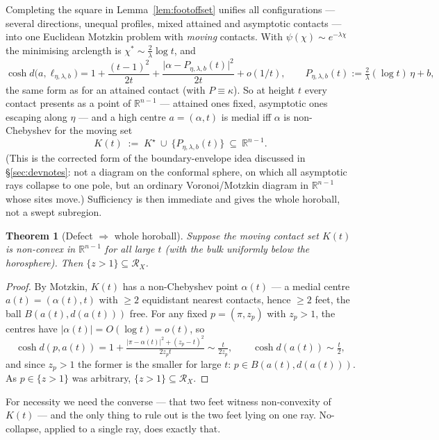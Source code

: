 \documentclass[11pt]{article}
\newtheorem{theorem}{Theorem}[section]
\theoremstyle{remark}
\newcommand{\R}{\mathbb{R}}
\newcommand{\X}{X}
\newcommand{\Rx}{\mathcal{R}_{\X}}
\newcommand{\B}{B}
\begin{document}
Completing the square in
Lemma~\ref{lem:footoffset} unifies all configurations --- several
directions, unequal profiles, mixed attained and asymptotic contacts ---
into one Euclidean Motzkin problem with \emph{moving} contacts. With
$\psi(\chi)\sim e^{-\lambda\chi}$ the minimising arclength is
$\chi^{\ast}\sim\frac{2}{\lambda}\log t$, and
\[
\cosh d\bigl(a,\ell_{\eta,\lambda,b}\bigr)
=1+\frac{(t-1)^{2}}{2t}+\frac{\bigl\lvert\alpha-P_{\eta,\lambda,b}(t)
\bigr\rvert^{2}}{2t}+o(1/t),\qquad
P_{\eta,\lambda,b}(t):=\tfrac{2}{\lambda}(\log t)\,\eta+b ,
\]
the same form as for an attained contact (with $P\equiv\kappa$). So at
height $t$ every contact presents as a point of $\R^{n-1}$ --- attained
ones fixed, asymptotic ones escaping along $\eta$ --- and a high centre
$a=(\alpha,t)$ is medial iff $\alpha$ is non-Chebyshev for the moving set
\[
K(t)\;:=\;K^{\star}\ \cup\ \bigl\{P_{\eta,\lambda,b}(t)\bigr\}
\ \subseteq\ \R^{n-1}.
\]
(This is the corrected form of the boundary-envelope idea discussed in
\S\ref{sec:devnotes}: not a diagram on the conformal sphere, on which all
asymptotic rays collapse to one pole, but an ordinary Voronoi/Motzkin
diagram in $\R^{n-1}$ whose sites move.) Sufficiency is then immediate
and gives the whole horoball, not a swept subregion.

\begin{theorem}[Defect $\Rightarrow$ whole horoball]\label{thm:movingsuff}
Suppose the moving contact set $K(t)$ is non-convex in $\R^{n-1}$ for
all large $t$ (with the bulk uniformly below the horosphere). Then
$\{z>1\}\subseteq\Rx$.
\end{theorem}

\begin{proof}
By Motzkin, $K(t)$ has a non-Chebyshev point $\alpha(t)$ --- a medial
centre $a(t)=(\alpha(t),t)$ with $\ge2$ equidistant nearest contacts,
hence $\ge2$ feet, the ball $\B(a(t),d(a(t)))$ free. For any fixed
$p=(\pi,z_{p})$ with $z_{p}>1$, the centres have $\lvert\alpha(t)\rvert
=O(\log t)=o(t)$, so
\[
\cosh d(p,a(t))=1+\tfrac{\lvert\pi-\alpha(t)\rvert^{2}+(z_{p}-t)^{2}}
{2z_{p}t}\sim\tfrac{t}{2z_{p}},\qquad
\cosh d(a(t))\sim\tfrac{t}{2},
\]
and since $z_{p}>1$ the former is the smaller for large $t$:
$p\in\B(a(t),d(a(t)))$. As $p\in\{z>1\}$ was arbitrary,
$\{z>1\}\subseteq\Rx$.
\end{proof}

For necessity we need the converse --- that two
feet witness non-convexity of $K(t)$ --- and the only thing to rule out
is the two feet lying on one ray. No-collapse, applied to a single ray,
does exactly that.
\end{document}
